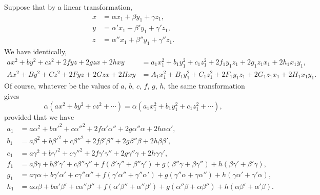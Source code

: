 \documentclass[11pt,a4paper]{book}
\begin{document}
Suppose that by a linear transformation,
\begin{align*}
x &= \alpha x_{1} + \beta y_{1} + \gamma z_{1}, \\
y &= \alpha' x_{1} + \beta' y_{1} + \gamma' z_{1}, \\
z &= \alpha'' x_{1} + \beta'' y_{1} + \gamma'' z_{1}.
\end{align*}
We have identically,
\begin{align*}
ax^{2} + by^{2} + cz^{2} + 2fyz + 2gzx + 2hxy &= a_{1}x_{1}^{2} + b_{1}y_{1}^{2} + c_{1}z_{1}^{2} + 2f_{1}y_{1}z_{1} + 2g_{1}z_{1}x_{1} + 2h_{1}x_{1}y_{1}, \\
Ax^{2} + By^{2} + Cz^{2} + 2Fyz + 2Gzx + 2Hxy &= A_{1}x_{1}^{2} + B_{1}y_{1}^{2} + C_{1}z_{1}^{2} + 2F_{1}y_{1}z_{1} + 2G_{1}z_{1}x_{1} + 2H_{1}x_{1}y_{1}.
\end{align*}
Of course, whatever be the values of $a$, $b$, $c$, $f$, $g$, $h$, the same transformation gives
\[
\alpha(ax^{2} + by^{2} + cz^{2} + \cdots) = \alpha(a_{1}x_{1}^{2} + b_{1}y_{1}^{2} + c_{1}z_{1}^{2} + \cdots),
\]
provided that we have
\begin{align*}
a_{1} &= a\alpha^{2} + b\alpha'^{2} + c\alpha''^{2} + 2f\alpha'\alpha'' + 2g\alpha''\alpha + 2h\alpha\alpha', \\
b_{1} &= a\beta^{2} + b\beta'^{2} + c\beta''^{2} + 2f\beta'\beta'' + 2g\beta''\beta + 2h\beta\beta', \\
c_{1} &= a\gamma^{2} + b\gamma'^{2} + c\gamma''^{2} + 2f\gamma'\gamma'' + 2g\gamma''\gamma + 2h\gamma\gamma', \\
f_{1} &= a\beta\gamma + b\beta'\gamma' + c\beta''\gamma'' + f(\beta'\gamma'' + \beta''\gamma') + g(\beta''\gamma + \beta\gamma'') + h(\beta\gamma' + \beta'\gamma), \\
g_{1} &= a\gamma\alpha + b\gamma'\alpha' + c\gamma''\alpha'' + f(\gamma'\alpha'' + \gamma''\alpha') + g(\gamma''\alpha + \gamma\alpha'') + h(\gamma\alpha' + \gamma'\alpha), \\
h_{1} &= a\alpha\beta + b\alpha'\beta' + c\alpha''\beta'' + f(\alpha'\beta'' + \alpha''\beta') + g(\alpha''\beta + \alpha\beta'') + h(\alpha\beta' + \alpha'\beta).
\end{align*}

\newpage

\setcounter{page}{429}
\end{document}
